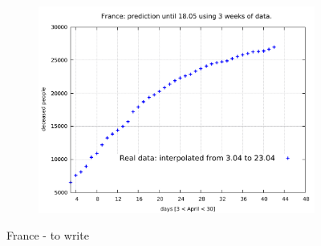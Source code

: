 \documentclass[8pt]{article}
\begin{document}
\begin{figure}[h!]
\begin{subfigure}[b]{0.45\linewidth}
  \includegraphics[width=\linewidth]{../tuned/fr/3-23/3-23.pdf}
  \end{subfigure}
	\caption{France - to write}
\end{figure}
\end{document}
